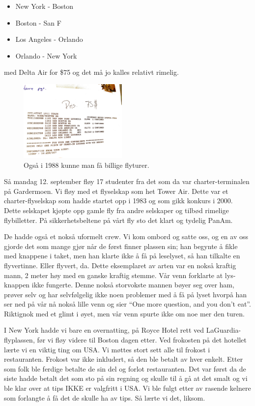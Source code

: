 \documentclass[../../main.tex]{subfiles}
\begin{document}
\begin{itemize}
	\item New York - Boston
	\item Boston - San F
	\item Los Angeles - Orlando
	\item Orlando - New York
\end{itemize}

med Delta Air for \$75 og det må jo kalles relativt rimelig. 

\begin{figure}
	\includegraphics[width=200px]{images/usa88/Flights.jpg}
	\caption{Også i 1988 kunne man få billige flyturer.}
\end{figure}

Så mandag 12. september fløy 17 studenter fra det som da var charter-terminalen på Gardermoen. Vi fløy med et flyselskap som het Tower Air. Dette var et charter-flyselskap som hadde startet opp i 1983 og som gikk konkurs i 2000. Dette selskapet kjøpte opp gamle fly fra andre selskaper og tilbød rimelige flybilletter. På sikkerhetsbeltene på vårt fly sto det klart og tydelig PanAm.

De hadde også et nokså uformelt crew. Vi kom ombord og satte oss, og en av oss gjorde det som mange gjør når de først finner plassen sin; han begynte å fikle med knappene i taket, men han klarte ikke å få på leselyset, så han tilkalte en flyvertinne. Eller flyvert, da. Dette eksemplaret av arten var en nokså kraftig mann, 2 meter høy med en ganske kraftig stemme. Vår venn forklarte at lys-knappen ikke fungerte. Denne nokså storvokste mannen bøyer seg over ham, prøver selv og har selvfølgelig ikke noen problemer med å få på lyset hvorpå han ser ned på vår nå nokså lille venn og sier “One more question, and you don’t eat”. Riktignok med et glimt i øyet, men vår venn spurte ikke om noe mer den turen.

I New York hadde vi bare en overnatting, på Royce Hotel rett ved LaGuardia-flyplassen, før vi fløy videre til Boston dagen etter. Ved frokosten på det hotellet lærte vi en viktig ting om USA. Vi møttes stort sett alle til frokost i restauranten. Frokost var ikke inkludert, så den ble betalt av hver enkelt. Etter som folk ble ferdige betalte de sin del og forlot restauranten. Det var først da de siste hadde betalt det som sto på sin regning og skulle til å gå at det smalt og vi ble klar over at tips IKKE er valgfritt i USA. Vi ble fulgt etter av rasende kelnere som forlangte å få det de skulle ha av tips. Så lærte vi det, liksom.
\end{document}
